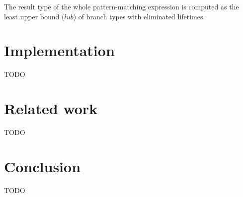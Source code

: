 \documentclass[11pt]{article}
\begin{document}
    The result type of the whole pattern-matching expression is computed as the least upper bound ($lub$) of branch types with eliminated lifetimes.



    \section{Implementation}

    TODO %


    \section{Related work}

    TODO %


    \section{Conclusion}

    TODO %

    
    
\end{document}
